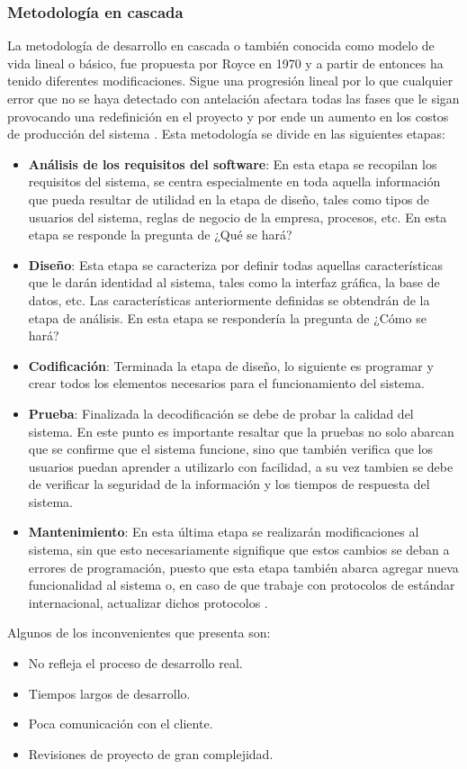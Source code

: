			\subsubsection{Metodología en cascada}
La metodología de desarrollo en cascada o también conocida como modelo de vida 
lineal o básico,  fue propuesta por Royce en 1970 y a partir de entonces ha tenido 
diferentes modificaciones. Sigue una progresión lineal por lo que cualquier error 
que no se haya detectado con antelación afectara todas las fases que le sigan 
provocando una redefinición en el proyecto y por ende un aumento en los costos 
de producción del sistema \cite{Ref:CarCascada}.
Esta metodología se divide en las siguientes etapas:
\begin{itemize}
	\item \textbf{Análisis de los requisitos del software}: En esta etapa se recopilan
	 los requisitos del sistema, se centra especialmente en toda aquella información 
	 que pueda resultar de utilidad en la etapa de diseño, tales como tipos de 
	 usuarios del sistema, reglas de negocio de la empresa, procesos, etc. En esta 
	 etapa se responde la pregunta de ¿Qué se hará? 
	\item \textbf{Diseño}: Esta etapa se caracteriza por definir todas aquellas 
	características que le darán identidad al sistema, tales como la interfaz 
	gráfica, la base de datos, etc. Las características anteriormente definidas 
	se obtendrán de la etapa de análisis. En esta etapa se respondería la pregunta 
	de ¿Cómo se hará? 
	\item \textbf{Codificación}: Terminada la etapa de diseño, lo siguiente es 
	programar y crear todos los elementos necesarios para el funcionamiento del sistema. 
	\item \textbf{Prueba}: Finalizada la decodificación se debe de probar la calidad 
	del sistema. En este punto es importante resaltar que la pruebas no solo abarcan 
	que se confirme que el sistema funcione, sino que también verifica que los 
	usuarios puedan aprender a utilizarlo con facilidad, a su vez tambien se debe de 
	verificar la seguridad de la información y los tiempos de respuesta del sistema.
	\item \textbf{Mantenimiento}: En esta última etapa se realizarán modificaciones 
	al sistema, sin que esto necesariamente signifique que estos cambios se deban 
	a errores de programación, puesto que esta etapa también abarca agregar nueva
	 funcionalidad al sistema o, en caso de que trabaje con protocolos de estándar 
	 internacional, actualizar dichos protocolos \cite{Ref:CarCascada}. 
\end{itemize}
Algunos de los inconvenientes que presenta son:
\begin{itemize}
	\item No refleja el proceso de desarrollo real.
	\item Tiempos largos de desarrollo.
	\item Poca comunicación con el cliente.
	\item Revisiones de proyecto de gran complejidad.
\end{itemize}

